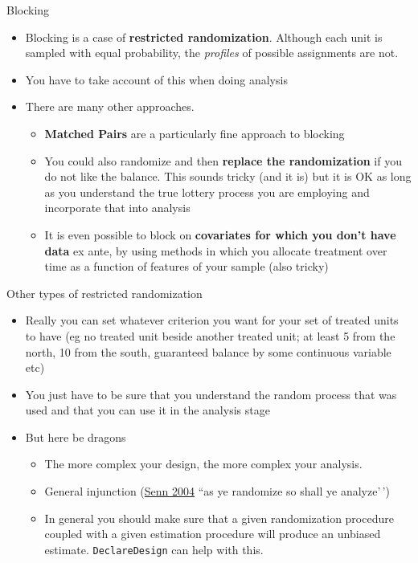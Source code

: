 \documentclass[
  11pt,
  ignorenonframetext,
]{beamer}
\providecommand{\tightlist}{%
  \setlength{\itemsep}{0pt}\setlength{\parskip}{0pt}}\usepackage{longtable,booktabs,array}
\begin{document}
\begin{frame}{Blocking}
\protect\hypertarget{blocking-2}{}
\begin{itemize}
\tightlist
\item
  Blocking is a case of \textbf{restricted randomization}. Although each
  unit is sampled with equal probability, the \textit{profiles} of
  possible assignments are not.
\item
  You have to take account of this when doing analysis
\item
  There are many other approaches.

  \begin{itemize}
  \tightlist
  \item
    \textbf{Matched Pairs} are a particularly fine approach to blocking
  \item
    You could also randomize and then \textbf{replace the randomization}
    if you do not like the balance. This sounds tricky (and it is) but
    it is OK as long as you understand the true lottery process you are
    employing and incorporate that into analysis
  \item
    It is even possible to block on \textbf{covariates for which you
    don't have data} ex ante, by using methods in which you allocate
    treatment over time as a function of features of your sample (also
    tricky)
  \end{itemize}
\end{itemize}
\end{frame}

\begin{frame}[fragile]{Other types of restricted randomization}
\protect\hypertarget{other-types-of-restricted-randomization}{}
\begin{itemize}
\tightlist
\item
  Really you can set whatever criterion you want for your set of treated
  units to have (eg no treated unit beside another treated unit; at
  least 5 from the north, 10 from the south, guaranteed balance by some
  continuous variable etc)
\item
  You just have to be sure that you understand the random process that
  was used and that you can use it in the analysis stage
\item
  But here be dragons

  \begin{itemize}
  \tightlist
  \item
    The more complex your design, the more complex your analysis.
  \item
    General injunction
    (\href{http://www.ncbi.nlm.nih.gov/pubmed/15580598}{Senn 2004} ``as
    ye randomize so shall ye analyze'\,')
  \item
    In general you should make sure that a given randomization procedure
    coupled with a given estimation procedure will produce an unbiased
    estimate. \texttt{DeclareDesign} can help with this.
  \end{itemize}
\end{itemize}
\end{frame}
\end{document}
